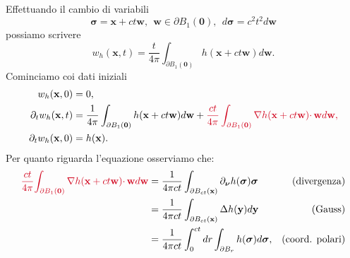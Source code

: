 \documentclass[10pt,a4paper,twoside,openright]{book}
\begin{document}
\begin{dimostrazione}
	Effettuando il cambio di variabili
	\begin{equation*}
		\bm{\sigma } =\mathbf{x} +ct\mathbf{w} ,\ \ \mathbf{w} \in \partial B_{1}(\mathbf{0}) ,\ \ d\bm{\sigma } =c^{2} t^{2} d\mathbf{w}
	\end{equation*}
	possiamo scrivere
	\begin{equation*}
		w_{h}(\mathbf{x} ,t) =\frac{t}{4\pi }\int _{\partial B_{1}(\mathbf{0})} h(\mathbf{x} +ct\mathbf{w}) d\mathbf{w} .
	\end{equation*}
	Cominciamo coi dati iniziali
	\begin{align*}
		w_{h}(\mathbf{x} ,0)               & =0,                                                                                                                                                                                                                                              \\
		\partial _{t} w_{h}(\mathbf{x} ,t) & =\frac{1}{4\pi }\int _{\partial B_{1}(\mathbf{0})} h(\mathbf{x} +ct\mathbf{w}) d\mathbf{w} +\textcolor[rgb]{0.82,0.01,0.11}{\frac{ct}{4\pi }\int _{\partial B_{1}(\mathbf{0})}\nabla h(\mathbf{x} +ct\mathbf{w})\cdotp \mathbf{w} d\mathbf{w} ,} \\
		\partial _{t} w_{h}(\mathbf{x} ,0) & =h(\mathbf{x}) .                                                                                                                                                                                                                                 
	\end{align*}
	Per quanto riguarda l'equazione osserviamo che:
	\begin{align*}
		\textcolor[rgb]{0.82,0.01,0.11}{\frac{ct}{4\pi }}\textcolor[rgb]{0.82,0.01,0.11}{\int _{\partial B_{1}(\mathbf{0})}\nabla h(\mathbf{x}+ct\mathbf{w})\cdotp \mathbf{w}d\mathbf{w}} & =\frac{1}{4\pi ct}\int _{\partial B_{ct}(\mathbf{x})} \partial _{\bm{\nu }} h(\bm{\sigma })\bm{\sigma } & \text{(divergenza)}    \\
		                                                                                                                                                                                  & =\frac{1}{4\pi ct}\int _{\partial B_{ct}(\mathbf{x})} \Delta h(\mathbf{y}) d\mathbf{y}                  & \text{(Gauss)}         \\
		                                                                                                                                                                                  & =\frac{1}{4\pi ct}\int _{0}^{ct} dr\int _{\partial B_{r}} h(\bm{\sigma }) d\bm{\sigma } ,               & \text{(coord. polari)} 

\end{align*}
\end{dimostrazione}
\end{document}

